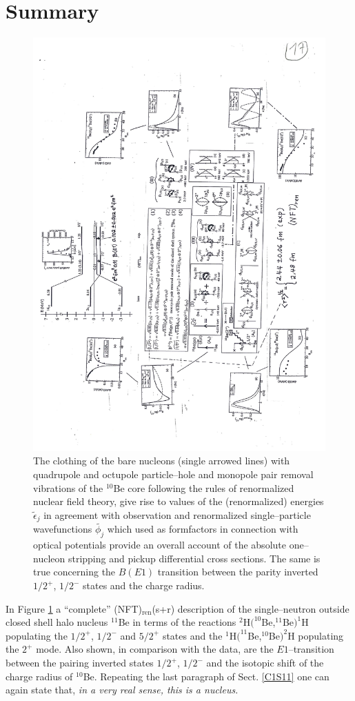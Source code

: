 \section{Summary}
      \begin{figure}
      \centerline{\includegraphics*[width=14cm,angle=0]{C8/figsC8/Fig6_3_1}}
      	\caption{The clothing of the bare nucleons (single arrowed lines) with quadrupole and octupole particle--hole and monopole pair removal vibrations of the $^{10}$Be core following the rules of renormalized nuclear field theory, give rise to values of the (renormalized) energies $\tilde\epsilon_j$ in agreement with observation and renormalized single--particle wavefunctions $\tilde{\phi_j}$ which used as formfactors in connection with optical potentials provide an overall account of the absolute one--nucleon stripping and pickup differential cross sections. The same is true concerning the $B(E1)$ transition between the parity inverted $1/2^+$, $1/2^-$ states and the charge radius.}\label{fig6.3.1}
      \end{figure} 
In Figure \ref{fig6.3.1} a ``complete'' (NFT)$_{\text{ren}}$(s+r) description of the single--neutron outside closed shell halo nucleus $^{11}$Be in terms of the reactions $^2$H$(^{10}$Be,$^{11}$Be$ )^1$H populating the $1/2^+$, $1/2^-$ and $5/2^+$ states and the $^1$H$(^{11}$Be,$^{10}$Be$)^2$H populating the $2^+$ mode. Also shown, in comparison with the data, are the $E1$--transition between the pairing inverted states $1/2^+$, $1/2^-$ and the isotopic shift of the charge radius of $^{10}$Be.  Repeating the last paragraph of Sect. \ref{C1S11} one can again state that, \textit{in a very real sense, this is a nucleus.} 
